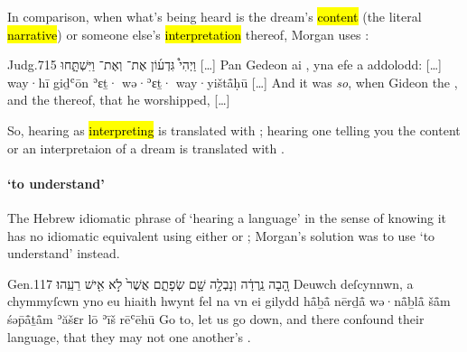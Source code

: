\begin{paper}
	{\click} In comparison, when what’s being heard is the dream’s \hl{content} (the literal \hl{narrative}) or someone else’s \hl{interpretation} thereof, Morgan uses :
\end{paper}

\begin{example}{Judg.}{7}{15}{}{}
	\quoling
	{וַיְהִי֩  גִּדְע֜וֹן אֶת־ וְאֶת־ וַיִּשְׁתָּ֑חוּ […]}%
	{Pan  Gedeon  ai , yna efe a addolodd: […]} %
	{way·hī  giḏʿōn ʾɛṯ· wə·ʾɛṯ· way·yištå̄ḥū […]}%
	{And it was \textit{so}, when Gideon  the , and the  thereof, that he worshipped, […]}%
\end{example}

\begin{paper}
	So, hearing as \hl{interpreting} is translated with ; hearing one telling you the content or an interpretaion of a dream is translated with .
\end{paper}



\paragraph[\C{deall}]{ ‘to understand’}

\begin{paper}
	The Hebrew idiomatic phrase of ‘hearing a language’ in the sense of knowing it has no idiomatic equivalent using either  or ; Morgan’s solution was to use  ‘to understand’ instead.
\end{paper}

\begin{example}{Gen.}{11}{7}{}{}
	\quoling
	{הָ֚בָה נֵֽרְדָ֔ה וְנָבְלָ֥ה שָׁ֖ם שְׂפָתָ֑ם אֲשֶׁר֙ לֹ֣א  אִ֖ישׁ  רֵעֵֽהוּ׃}
	{Deuwch deſcynnwn, a chymmyſcwn yno eu hiaith hwynt fel na  vn  ei gilydd}
	{hå̄ḇå̄ nērḏå̄ wə·nå̄ḇlå̄ šå̄m śəp̄å̄ṯå̄m ʾăšɛr lō  ʾīš  rēʿēhū}
	{Go to, let us go down, and there confound their language, that they may not  one another’s .}
\end{example}

